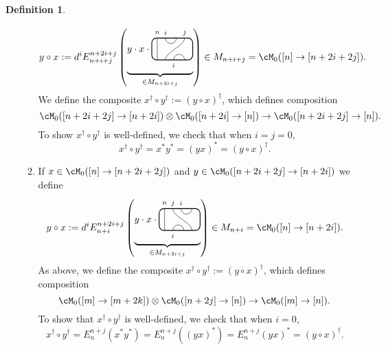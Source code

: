 \documentclass[11pt]{article}
\theoremstyle{plain}
\theoremstyle{definition}
\newtheorem{defn}[thm]{Definition}
\begin{document}
\begin{defn}
\begin{itemize}
\begin{enumerate}[label={\rm(C\arabic*)}]
$$
y\circ x
:=
d^iE^{n+2i+j}_{n+i+j}
\left(
\raisebox{.3cm}{$
\underbrace{
y\cdot x \cdot
\begin{tikzpicture}[baseline = .3cm]
 \draw[thick, rounded corners = 5pt] (0,0) rectangle (1.5,.8);
 \draw (.2,0) -- (.2,.8);
 \draw (.5,.8) arc (-180:0:.2cm);
 \draw (.5,0) .. controls ++(90:.3cm) and ++(270:.3cm) .. (1.2,.8);
 \draw (.8,0) arc (180:0:.2cm);
 \node at (.2,1) {\scriptsize{$n$}};
 \node at (.5,1) {\scriptsize{$i$}};
 \node at (1.2,1) {\scriptsize{$j$}};
 \node at (.8,-.2) {\scriptsize{$i$}};
\end{tikzpicture}
}_{\in M_{n+2i+j}}
$}
\right)
\in M_{n+i+j}
=
\cM_0([n] \to [n+2i+2j]).
$$
We define the composite $x^\dag \circ y^\dag := (y\circ x)^\dag$, which defines composition 
$$
\cM_0([n+2i+2j] \to [n+2i]) \otimes \cM_0([n+2i] \to [n]) \to \cM_0([n+2i+2j] \to [n]).
$$
To show $x^\dag \circ y^\dag$ is well-defined, we check that when $i=j=0$,
\begin{equation}
\label{eq:n to n to n}
x^\dag\circ y^\dag= x^* y^* = (y x)^* = (y\circ x)^\dag.
\end{equation}

\item
\label{compose:updown}
If $x\in \cM_0([n] \to [n+2i+2j])$ and $y \in \cM_0([n+2i+2j] \to [n+2i])$
we define
$$
y\circ x
:=
d^iE^{n+2i + j}_{n+i}
\left(
\raisebox{.3cm}{$
\underbrace{
y\cdot x\cdot
\begin{tikzpicture}[baseline = .3cm]
 \draw[thick, rounded corners = 5pt] (0,0) rectangle (1.5,.8);
 \draw (.2,0) -- (.2,.8);
 \draw (.8,.8) arc (-180:0:.2cm);
 \draw (1.2,0) .. controls ++(90:.3cm) and ++(270:.3cm) .. (.5,.8);
 \draw (.5,0) arc (180:0:.2cm);
 \node at (.2,1) {\scriptsize{$n$}};
 \node at (.5,1) {\scriptsize{$j$}};
 \node at (.8,1) {\scriptsize{$i$}};
 \node at (.5,-.2) {\scriptsize{$i$}};
\end{tikzpicture}
}_{\in M_{n+2i +j}}
$}
\right)
\in
M_{n+i}
=
\cM_0([n] \to [n+2i]).
$$
As above, we define the composite $x^\dag \circ y^\dag := (y\circ x)^\dag$, which defines composition
$$
\cM_0([m] \to [m+2k]) \otimes \cM_0([n+2j] \to [n]) \to \cM_0([m] \to [n]).
$$
To show that $x^\dag \circ y^\dag$ is well-defined, we check that when $i=0$, 
\begin{equation}
\label{eq:n to n+2k to n}
x^\dag \circ y^\dag 
=
E^{n+j}_{n}(x^* y^*)
=
E^{n+j}_{n}((yx)^*) 
=
E^{n+j}_{n}(y x)^*
=
(y\circ x)^\dag.
\end{equation}


\end{enumerate}
\end{itemize}
\end{defn}
\end{document}
